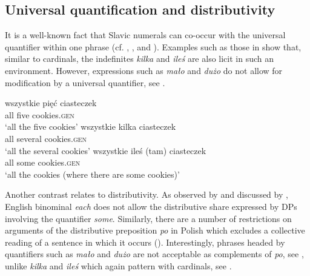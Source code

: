 \documentclass[output=paper,
]{langscibook}
\begin{document}
	\subsection{Universal quantification and distributivity}\label{sec:universal-quantification-and-distributivity}

\largerpage[2]	
	It is a well-known fact that Slavic numerals can co-occur with the universal quantifier within one phrase (cf. \citealt{corbett1978universals}, \citealt{gvozdanovic1999some}, and \citealt{miechowicz-mathiasen2011syntax}). Examples such as those in  show that, similar to cardinals, the indefinites \textit{kilka} and \textit{ileś} are also licit in such an environment. However, expressions such as \textit{mało} and \textit{dużo} do not allow for modification by a universal quantifier, see .
	
	\ea \label{ex:universal-quantifier-cardinals} \ea \gll wszystkie pięć ciasteczek\\
	all five cookies.\textsc{gen}\\
	\glt `all the five cookies'
	\ex \gll wszystkie kilka ciasteczek\\
	all several cookies.\textsc{gen}\\
	\glt `all the several cookies'
	\ex \gll wszystkie {ileś (tam)} ciasteczek\\
	all some cookies.\textsc{gen}\\
	\glt `all the cookies (where there are some cookies)'
	\z
    \z

	\ea \label{ex:universal-quantifier-malo} 
	\z
    \z

	\noindent Another contrast relates to distributivity. As observed by \cite{safir_stowell1988binominal} and discussed by \cite{borer2005name}, English binominal \textit{each} does not allow the distributive share expressed by DPs involving the quantifier \textit{some}. Similarly, there are a number of restrictions on arguments of the distributive preposition \textit{po} in Polish which excludes a collective reading of a sentence in which it occurs (\citealt{przepiorkowski2008generalised}). Interestingly, phrases headed by quantifiers such as \textit{mało} and \textit{dużo} are not acceptable as complements of \textit{po}, see , unlike \textit{kilka} and \textit{ileś} which again pattern with cardinals, see .
	
\end{document}
